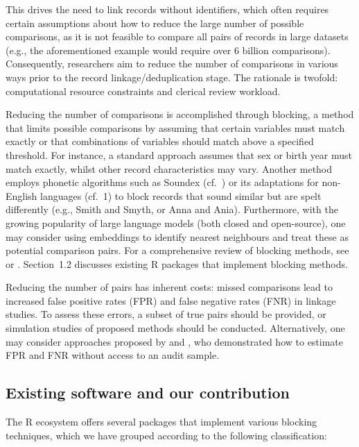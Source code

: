This drives the need to link records without identifiers, which often
requires certain assumptions about how to reduce the large number of
possible comparisons, as it is not feasible to compare all pairs of
records in large datasets (e.g., the aforementioned example would
require over 6 billion comparisons). Consequently, researchers aim to
reduce the number of comparisons in various ways prior to the record
linkage/deduplication stage. The rationale is twofold: computational
resource constraints and clerical review workload.

Reducing the number of comparisons is accomplished through blocking, a
method that limits possible comparisons by assuming that certain
variables must match exactly or that combinations of variables should
match above a specified threshold. For instance, a standard approach
assumes that sex or birth year must match exactly, whilst other record
characteristics may vary. Another method employs phonetic algorithms
such as Soundex (cf.~\citet{Wright1960}) or its adaptations for non-English
languages (cf.~1) to block records that sound similar but
are spelt differently (e.g., Smith and Smyth, or Anna and Ania).
Furthermore, with the growing popularity of large language models (both
closed and open-source), one may consider using embeddings
\citep{mikolov2013efficient} to identify nearest neighbours and treat these
as potential comparison pairs. For a comprehensive review of blocking
methods, see \citet{Steorts2014} or \citet{Papadakis2020}. Section~1.2 discusses
existing R packages that implement blocking methods.

Reducing the number of pairs has inherent costs: missed comparisons lead
to increased false positive rates (FPR) and false negative rates (FNR)
in linkage studies. To assess these errors, a subset of true pairs
should be provided, or simulation studies of proposed methods should be
conducted. Alternatively, one may consider approaches proposed by
\citet{dasylva2021estimating} and \citet{dasylva2022consistent}, who demonstrated how
to estimate FPR and FNR without access to an audit sample.

\subsection{Existing software and our contribution}\label{sec-software}

The R ecosystem offers several packages that implement various blocking
techniques, which we have grouped according to the following
classification:

